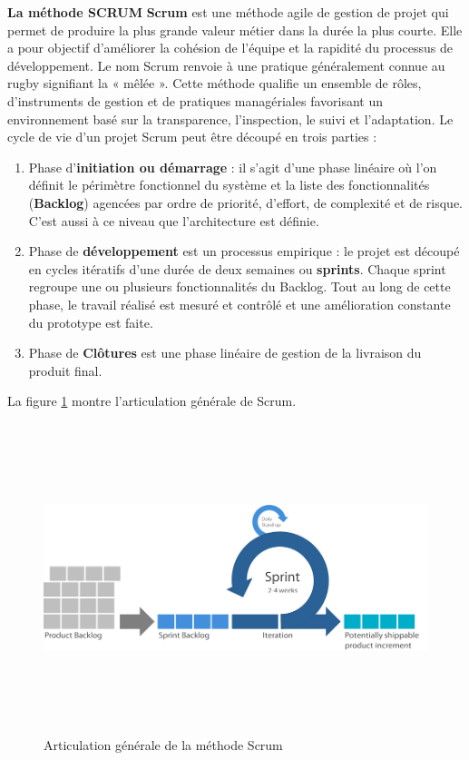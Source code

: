 \textbf{La méthode SCRUM}
\newline
\textbf{Scrum} est une méthode agile de gestion de projet qui permet de produire la plus grande valeur métier dans la durée la plus courte. Elle a pour objectif d’améliorer la cohésion de l’équipe et la rapidité du processus de développement. Le nom Scrum renvoie à une pratique généralement connue au rugby signifiant la « mêlée ». \newline
Cette méthode qualifie un ensemble de rôles, d’instruments de gestion et de pratiques managériales favorisant un environnement basé sur la transparence, l’inspection, le suivi et l’adaptation. Le cycle de vie d’un projet Scrum peut être découpé en trois parties :
\begin{enumerate}
	\item Phase d'\textbf{initiation ou démarrage} : il s’agit d’une phase linéaire où l’on définit le périmètre fonctionnel du système et la liste des fonctionnalités (\textbf{Backlog}) agencées par ordre de priorité, d’effort, de complexité et de risque. C’est aussi à ce niveau que l’architecture est définie.
	
	\item Phase de \textbf{développement} est un processus empirique : le projet est découpé en cycles itératifs d’une durée de deux semaines ou \textbf{sprints}. Chaque sprint regroupe une ou plusieurs fonctionnalités du Backlog. Tout au long de cette phase, le travail réalisé est mesuré et contrôlé et une amélioration constante du prototype est faite.
	
	\item Phase de \textbf{Clôtures} est une phase linéaire de gestion de la livraison du produit final.
\end{enumerate}
La figure \ref{Scrum} montre l’articulation générale de Scrum. \newline
\begin{figure}[h]
	\includegraphics[width=18cm, height=9cm]{Images/scrum}
	\centering
	\caption{Articulation générale de la méthode Scrum}
	\label{Scrum}
\end{figure}
